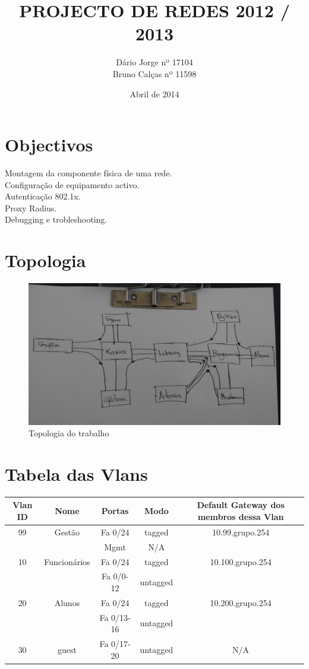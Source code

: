 \documentclass[a4paper,titlepage]{article}
\title{PROJECTO DE REDES 2012 / 2013}
\author{
	Dário Jorge  nº 17104\\
	Bruno Calças nº 11598\\
}
\date{Abril de 2014}
\begin{document}
	\maketitle
	
	\newpage
	
	\tableofcontents
	
	\newpage
	
	\section{Objectivos}
		Montagem da componente física de uma rede.\\
		Configuração de equipamento activo.\\
		Autenticação 802.1x.\\
		Proxy Radius.\\
		Debugging e trobleshooting.\\
	\section{Topologia}
		\begin{figure}[H]
			\centering
			\includegraphics[width=\linewidth]{topologia.jpg}
			\caption{Topologia do trabalho}
		\end{figure}
	\section{Tabela das Vlans}
		\begin{tabular}{|c|c|c|c|c|}
			\hline Vlan ID & Nome & Portas & Modo & Default Gateway dos membros dessa Vlan\\
			\hline
			99 & Gestão & Fa 0/24 & tagged & 10.99.grupo.254\\ 
			\cline{3-4} && Mgmt & N/A &\\ \hline
			10 & Funcionários & Fa 0/24 & tagged & 10.100.grupo.254\\ 
			\cline{3-4} && Fa 0/0-12 & untagged &\\ \hline
			20 & Alunos & Fa 0/24 & tagged & 10.200.grupo.254\\ 
			\cline{3-4} && Fa 0/13-16 & untagged &\\ \hline
			30 & guest & Fa 0/17-20 & untagged & N/A\\
			\hline
			\end{tabular}
\end{document}
